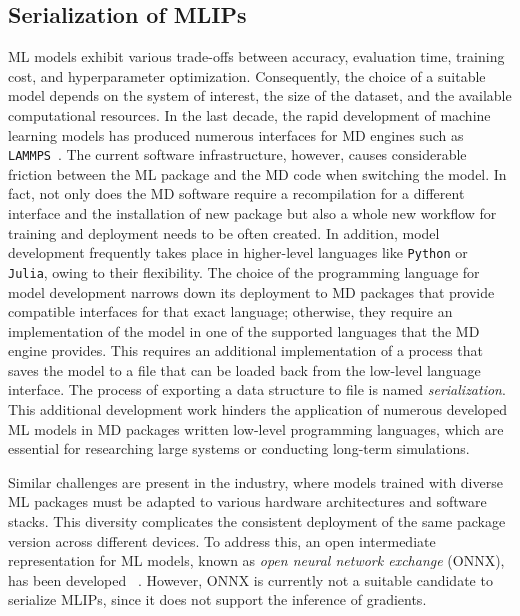 \subsection{Serialization of MLIPs}
ML models exhibit various trade-offs between accuracy, evaluation time, training cost, and hyperparameter optimization.
Consequently, the choice of a suitable model depends on the system of interest, the size of the dataset, and the available computational resources.
In the last decade, the rapid development of machine learning models has produced numerous interfaces for MD engines such as \texttt{LAMMPS}~\cite{lammpsmliap,lammpsmlpace,lammpsmlpod,lammpsmlquip,lammpsmlhdnnp}.
The current software infrastructure, however, causes considerable friction between the ML package and the MD code when switching the model.
In fact, not only does the MD software require a recompilation for a different interface and the installation of new package but also a whole new workflow for training and deployment needs to be often created.
In addition, model development frequently takes place in higher-level languages like \texttt{Python} or \texttt{Julia}, owing to their flexibility.
The choice of the programming language for model development narrows down its deployment to MD packages that provide compatible interfaces for that exact language; otherwise, they require an implementation of the model in one of the supported languages that the MD engine provides.
This requires an additional implementation of a process that saves the model to a file that can be loaded back from the low-level language interface.
The process of exporting a data structure to file is named \emph{serialization}.
This additional development work hinders the application of numerous developed ML models in MD packages written low-level programming languages, which are essential for researching large systems or conducting long-term simulations.


Similar challenges are present in the industry, where models trained with diverse ML packages must be adapted to various hardware architectures and software stacks.
This diversity complicates the consistent deployment of the same package version across different devices.
To address this, an open intermediate representation for ML models, known as \emph{open neural network exchange} (ONNX), has been developed ~\cite{bai2019}.
However, ONNX is currently not a suitable candidate to serialize MLIPs, since it does not support the inference of gradients.

